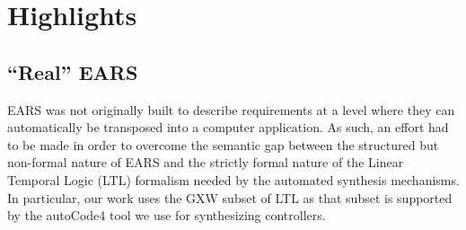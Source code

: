\section{Highlights}
\vspace{-.2cm}
\subsection{``Real'' EARS}
\vspace{-.1cm}
EARS was not originally built to describe requirements at a level where they can
automatically be transposed into a computer application. As such, an effort had
to be made in order to overcome the semantic gap between the structured but
non-formal nature of EARS and the strictly formal nature of the Linear Temporal
Logic (LTL) formalism needed by the automated synthesis
mechanisms. In particular, our work uses the  \textsf{GXW} subset of LTL as that
subset is supported by the \textsf{autoCode4} tool we use for synthesizing
controllers.

